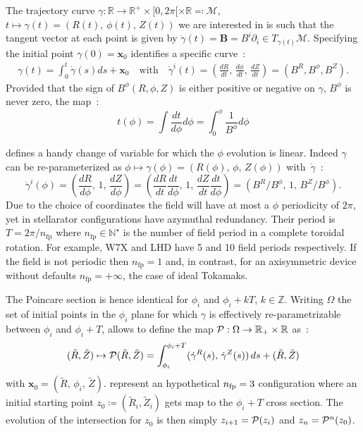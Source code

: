 The trajectory curve $\gamma : \mathbb{R}\rightarrow\mathbb{R}^+\times[0,2\pi[\times\mathbb{R} \eqqcolon \mathcal{M}$, $t \mapsto \gamma(t) = (R(t),\,\phi(t),\,Z(t))$ we are interested in is such that the tangent vector at each point is given by $\dot{\gamma}(t)= \textbf{B} = B^i\partial_i \in T_{\gamma(t)}\mathcal{M}$. Specifying the initial point $\gamma(0) = \textbf{x}_0$ identifies a specific curve~:
\begin{align*}
    \gamma(t) = \int_0^t\dot{\gamma}(s)ds + \textbf{x}_0 \quad \text{with} \quad   \dot{\gamma}^i(t)= (\frac{dR}{dt},\,\frac{d\phi}{dt},\,\frac{dZ}{dt}) = (B^R, B^\phi, B^Z).
\end{align*}
Provided that the sign of $B^\phi(R, \phi, Z)$ is either positive or negative on $\gamma$, $B^\phi$ is never zero, the map~:
\begin{equation*}
    t(\phi) = \int \frac{dt}{d\phi}d\phi = \int_0^\phi \frac{1}{B^\phi}d\phi
\end{equation*}

defines a handy change of variable for which the $\phi$ evolution is linear. Indeed $\gamma$ can be re-parameterized as $\phi \mapsto \gamma(\phi) = (R(\phi),\,\phi,\,Z(\phi))$ with~$\dot{\gamma}$~:
\begin{equation*}
    \dot{\gamma}^i(\phi) = (\frac{dR}{d\phi},\,1,\,\frac{dZ}{d\phi}) = (\frac{dR}{dt}\frac{dt}{d\phi},\,1,\,\frac{dZ}{dt}\frac{dt}{d\phi}) = (B^R/B^\phi,\, 1,\,B^Z/B^\phi).
\end{equation*}
Due to the choice of coordinates the field will have at most a $\phi$ periodicity of $2\pi$, yet in stellarator configurations have azymuthal redundancy. Their period is $T = 2\pi/n_\text{fp}$ where $n_\text{fp}\in\mathbb{N}^\star$ is the number of field period in a complete toroidal rotation. For example, W7X and LHD have 5 and 10 field periods respectively. If the field is not periodic then $n_\text{fp} = 1$ and, in contrast, for an axisymmetric device without defaults $n_\text{fp} = +\infty$, the case of ideal Tokamaks.

The Poincare section is hence identical for $\phi_i$ and $\phi_i+kT$, $k\in\mathbb{Z}$. Writing $\Omega$ the set of initial points in the $\phi_i$ plane for which $\gamma$ is effectively re-parametrizable between $\phi_i$ and $\phi_i + T$, allows to define the map $\mathcal{P} : \Omega \rightarrow \mathbb{R}_+\times\mathbb{R}$ as~:
\begin{equation*}
    (\tilde{R},\tilde{Z}) \mapsto \mathcal{P}(\tilde{R},\tilde{Z}) = \int_{\phi_i}^{\phi_i+T}(
        \dot{\gamma}^R(s),\,
        \dot{\gamma}^Z(s)
    )\,ds + (\tilde{R},\tilde{Z})
\end{equation*}
with $\textbf{x}_0 = (\tilde{R},\,\phi_i,\,\tilde{Z})$.  represent an hypothetical $n_\text{fp} = 3$ configuration where an initial starting point $z_0\coloneqq (\tilde{R}_i,\tilde{Z}_i)$ gets map to the $\phi_i + T$ cross section. The evolution of the intersection for $z_0$ is then simply $z_{i+1} = \mathcal{P}(z_i)$ and $z_n = \mathcal{P}^n(z_0)$. 

